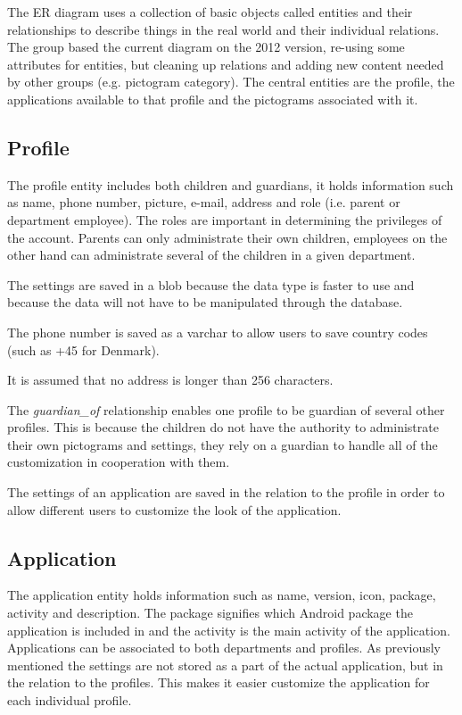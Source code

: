 The ER diagram uses a collection of basic objects called entities and their relationships to describe things in the real world and their individual relations. The group based the current diagram on the 2012 version, re-using some attributes for entities, but cleaning up relations and adding new content needed by other groups (e.g. pictogram category).  The central entities are the profile, the applications available to that profile and the pictograms associated with it. 

\subsection{Profile}
The profile entity includes both children and guardians, it holds information such as name, phone number, picture, e-mail, address and role (i.e. parent or department employee). The roles are important in determining the privileges of the account. Parents can only administrate their own children, employees on the other hand can administrate several of the children in a given department. 

The settings are saved in a blob because the data type is faster to use and because the data will not have to be manipulated through the database.

The phone number is saved as a varchar to allow users to save country codes (such as +45 for Denmark). 

It is assumed that no address is longer than 256 characters.

The \emph{guardian\_of} relationship enables one profile to be guardian of several other profiles. This is because the children do not have the authority to administrate their own pictograms and settings, they rely on a guardian to handle all of the customization in cooperation with them. 

The settings of an application are saved in the relation to the profile in order to allow different users to customize the look of the application.

\subsection{Application}
The application entity holds information such as name, version, icon, package, activity and description. 
The package signifies which Android package the application is included in and the activity is the main activity of the application. Applications can be associated to both departments and profiles. As previously mentioned the settings are not stored as a part of the actual application, but in the relation to the profiles. This makes it easier customize the application for each individual profile.
 
